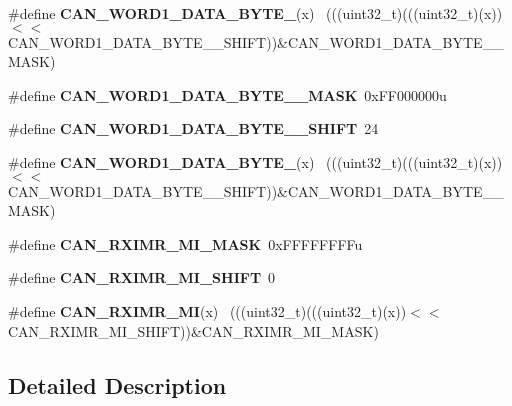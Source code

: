 \begin{DoxyCompactItemize}
\item 
\hypertarget{group___c_a_n___register___masks_gae9b2fe38e6639a4bac1a9f774bf4716c}{}\#define {\bfseries C\+A\+N\+\_\+\+W\+O\+R\+D1\+\_\+\+D\+A\+T\+A\+\_\+\+B\+Y\+T\+E\+\_}(x)                              ~(((uint32\+\_\+t)(((uint32\+\_\+t)(x))$<$$<$C\+A\+N\+\_\+\+W\+O\+R\+D1\+\_\+\+D\+A\+T\+A\+\_\+\+B\+Y\+T\+E\+\_\+\_\+\+S\+H\+I\+F\+T))\&C\+A\+N\+\_\+\+W\+O\+R\+D1\+\_\+\+D\+A\+T\+A\+\_\+\+B\+Y\+T\+E\+\_\+\_\+\+M\+A\+S\+K)\label{group___c_a_n___register___masks_gae9b2fe38e6639a4bac1a9f774bf4716c}

\item 
\hypertarget{group___c_a_n___register___masks_ga9330617952319833e6c0ccf8d115144b}{}\#define {\bfseries C\+A\+N\+\_\+\+W\+O\+R\+D1\+\_\+\+D\+A\+T\+A\+\_\+\+B\+Y\+T\+E\+\_\+\_\+\+M\+A\+S\+K}~0x\+F\+F000000u\label{group___c_a_n___register___masks_ga9330617952319833e6c0ccf8d115144b}

\item 
\hypertarget{group___c_a_n___register___masks_gaa7615281b358dfed5fb817b9c1fb157e}{}\#define {\bfseries C\+A\+N\+\_\+\+W\+O\+R\+D1\+\_\+\+D\+A\+T\+A\+\_\+\+B\+Y\+T\+E\+\_\+\_\+\+S\+H\+I\+F\+T}~24\label{group___c_a_n___register___masks_gaa7615281b358dfed5fb817b9c1fb157e}

\item 
\hypertarget{group___c_a_n___register___masks_ga38ed4f81f5858160b669afb49724153f}{}\#define {\bfseries C\+A\+N\+\_\+\+W\+O\+R\+D1\+\_\+\+D\+A\+T\+A\+\_\+\+B\+Y\+T\+E\+\_}(x)                              ~(((uint32\+\_\+t)(((uint32\+\_\+t)(x))$<$$<$C\+A\+N\+\_\+\+W\+O\+R\+D1\+\_\+\+D\+A\+T\+A\+\_\+\+B\+Y\+T\+E\+\_\+\_\+\+S\+H\+I\+F\+T))\&C\+A\+N\+\_\+\+W\+O\+R\+D1\+\_\+\+D\+A\+T\+A\+\_\+\+B\+Y\+T\+E\+\_\+\_\+\+M\+A\+S\+K)\label{group___c_a_n___register___masks_ga38ed4f81f5858160b669afb49724153f}

\item 
\hypertarget{group___c_a_n___register___masks_ga3cef91282e43c8e5d2c30e65d375f964}{}\#define {\bfseries C\+A\+N\+\_\+\+R\+X\+I\+M\+R\+\_\+\+M\+I\+\_\+\+M\+A\+S\+K}~0x\+F\+F\+F\+F\+F\+F\+F\+Fu\label{group___c_a_n___register___masks_ga3cef91282e43c8e5d2c30e65d375f964}

\item 
\hypertarget{group___c_a_n___register___masks_gae3dd7acc84e521ca0a05beb33f7b434c}{}\#define {\bfseries C\+A\+N\+\_\+\+R\+X\+I\+M\+R\+\_\+\+M\+I\+\_\+\+S\+H\+I\+F\+T}~0\label{group___c_a_n___register___masks_gae3dd7acc84e521ca0a05beb33f7b434c}

\item 
\hypertarget{group___c_a_n___register___masks_gab51c9bf30934a1eec4e00ac689d76540}{}\#define {\bfseries C\+A\+N\+\_\+\+R\+X\+I\+M\+R\+\_\+\+M\+I}(x)                                                ~(((uint32\+\_\+t)(((uint32\+\_\+t)(x))$<$$<$C\+A\+N\+\_\+\+R\+X\+I\+M\+R\+\_\+\+M\+I\+\_\+\+S\+H\+I\+F\+T))\&C\+A\+N\+\_\+\+R\+X\+I\+M\+R\+\_\+\+M\+I\+\_\+\+M\+A\+S\+K)\label{group___c_a_n___register___masks_gab51c9bf30934a1eec4e00ac689d76540}

\end{DoxyCompactItemize}


\subsection{Detailed Description}
